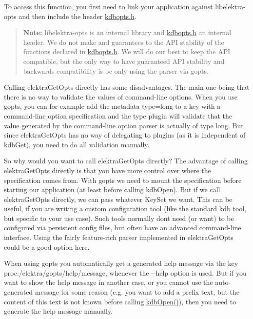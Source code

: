 To access this function, you first need to link your application against {\ttfamily libelektra-\/opts} and then include the header {\ttfamily \hyperlink{kdbopts_8h}{kdbopts.\+h}}.

\begin{quote}
{\bfseries Note\+:} {\ttfamily libelektra-\/opts} is an internal library and {\ttfamily \hyperlink{kdbopts_8h}{kdbopts.\+h}} an internal header. We do not make and guarantees to the A\+PI stability of the functions declared in {\ttfamily \hyperlink{kdbopts_8h}{kdbopts.\+h}}. We will do our best to keep the A\+PI compatible, but the only way to have guaranteed A\+PI stability and backwards compatibility is be only using the parser via {\ttfamily gopts}. \end{quote}


Calling {\ttfamily elektra\+Get\+Opts} directly has some disadvantages. The main one being that there is no way to validate the values of command-\/line options. When you use {\ttfamily gopts}, you can for example add the metadata {\ttfamily type=long} to a key with a command-\/line option specification and the {\ttfamily type} plugin will validate that the value generated by the command-\/line option parser is actually of type {\ttfamily long}. But since {\ttfamily elektra\+Get\+Opts} has no way of delegating to plugins (as it is independent of {\ttfamily kdb\+Get}), you need to do all validation manually.

So why would you want to call {\ttfamily elektra\+Get\+Opts} directly? The advantage of calling {\ttfamily elektra\+Get\+Opts} directly is that you have more control over where the specification comes from. With {\ttfamily gopts} we need to mount the specification before starting our application (at least before calling {\ttfamily kdb\+Open}). But if we call {\ttfamily elektra\+Get\+Opts} directly, we can pass whatever Key\+Set we want. This can be useful, if you are writing a custom configuration tool (like the standard {\ttfamily kdb} tool, but specific to your use case). Such tools normally don\textquotesingle{}t need (or want) to be configured via persistent config files, but often have an advanced command-\/line interface. Using the fairly feature-\/rich parser implemented in {\ttfamily elektra\+Get\+Opts} could be a good option here.

When using {\ttfamily gopts} you automatically get a generated help message via the key {\ttfamily proc\+:/elektra/gopts/help/message}, whenever the {\ttfamily -\/-\/help} option is used. But if you want to show the help message in another case, or you cannot use the auto-\/generated message for some reason (e.\+g. you want to add a prefix text, but the content of this text is not known before calling {\ttfamily \hyperlink{group__kdb_ga844e1299a84c3fbf1d3a905c5c893ba5}{kdb\+Open()}}), then you need to generate the help message manually.

